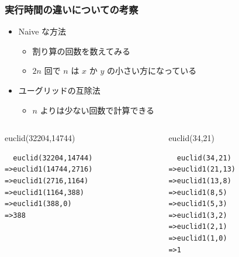 \begin{frame}[fragile]
\frametitle{実行時間の違いについての考察}
  \begin{itemize}
\item Naive な方法
    \begin{itemize}
\item 割り算の回数を数えてみる
\item $2n$ 回で $n$ は $x$ か $y$ の小さい方になっている
    \end{itemize}
\item ユーグリッドの互除法
    \begin{itemize}
\item $n$ よりは少ない回数で計算できる
    \end{itemize}
  \end{itemize}
  \begin{columns}[t]
    \begin{column}{0.45\textwidth}
      \begin{itembox}{euclid(32204,14744)}
\scriptsize
        \begin{verbatim}
  euclid(32204,14744)
=>euclid1(14744,2716)
=>euclid1(2716,1164)
=>euclid1(1164,388)
=>euclid1(388,0)
=>388
        \end{verbatim}
      \end{itembox}
    \end{column}
    \begin{column}{0.45\textwidth}
      \begin{itembox}{euclid(34,21)}
\scriptsize
        \begin{verbatim}
  euclid(34,21)
=>euclid1(21,13)
=>euclid1(13,8)
=>euclid1(8,5)
=>euclid1(5,3)
=>euclid1(3,2)
=>euclid1(2,1)
=>euclid1(1,0)
=>1
        \end{verbatim}
      \end{itembox}
    \end{column}
  \end{columns}
\end{frame}
